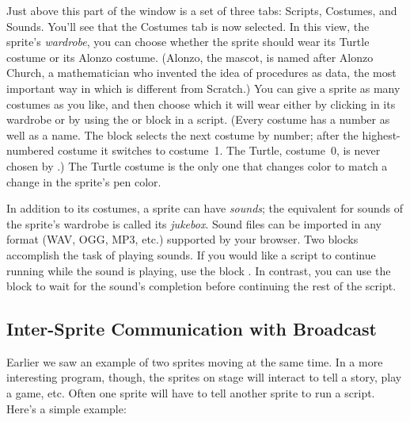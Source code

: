 \documentclass{report}
\begin{document}

Just above this part of the window is a set of three tabs: Scripts, Costumes, and Sounds. You'll see that the Costumes tab is now selected. In this view, the sprite's \emph{wardrobe}, you can choose whether the sprite should wear its Turtle costume or its Alonzo costume. (Alonzo, the \Snap{} mascot, is named after Alonzo Church, a mathematician who invented the idea of procedures as data, the most important way in which \Snap{} is different from Scratch.) You can give a sprite as many costumes as you like, and then choose which it will wear either by clicking in its wardrobe or by using the  or  block in a script. (Every costume has a number as well as a name. The  block selects the next costume by number; after the highest-numbered costume it switches to costume~1. The Turtle, costume~0, is never chosen by .) The Turtle costume is the only one that changes color to match a change in the sprite's pen color.

In addition to its costumes, a sprite can have \emph{sounds}; the equivalent for sounds of the sprite's wardrobe is called its \emph{jukebox}. Sound files can be imported in any format (WAV, OGG, MP3, etc.) supported by your browser. Two blocks accomplish the task of playing sounds. If you would like a script to continue running while the sound is playing, use the block . In contrast, you can use the  block to wait for the sound's completion before continuing the rest of the script.

\subsection{Inter-Sprite Communication with Broadcast}

Earlier we saw an example of two sprites moving at the same time. In a more interesting program, though, the sprites on stage will interact to tell a story, play a game, etc. Often one sprite will have to tell another sprite to run a script. Here's a simple example:\nopagebreak
\end{document}
